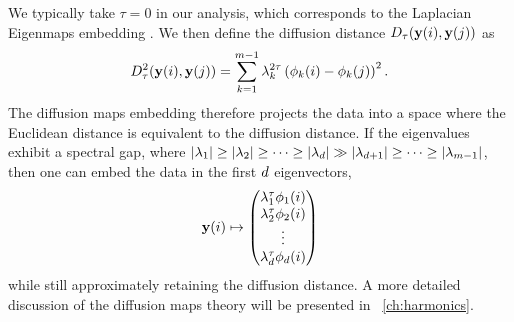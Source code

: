 %
We typically take $\tau=0$ in our analysis, which corresponds to the Laplacian Eigenmaps embedding \cite{Belkin2003}.  
%
We then define the diffusion distance $D_\tau (\mathbf{y}(i), \mathbf{y}(j))$ as 
\begin{equation}
D_\tau^2 (\mathbf{y}(i), \mathbf{y}(j)) = \sum_{k=1}^{m-1} \lambda_k^{2\tau} \left( \phi_k(i)- \phi_k(j) \right)^2.
\end{equation}
%
The diffusion maps embedding therefore projects the data into a space where the Euclidean distance is equivalent to the diffusion distance. 
%
If the eigenvalues exhibit a spectral gap, where $|\lambda_1| \ge |\lambda_2| \ge \dots \ge |\lambda_d | \gg |\lambda_{d+1} | \ge \dots \ge |\lambda_{m-1}|$, then one can embed the data in the first $d$ eigenvectors, 
\begin{equation} \label{eq:dmaps_embed_reduced}
\mathbf{y}(i) \mapsto 
\begin{pmatrix}
\lambda_1^\tau \phi_1(i) \\
\lambda_2^\tau \phi_2(i) \\
\vdots \\
\lambda_{d}^\tau  \phi_{d}(i)
\end{pmatrix}
\end{equation}
%
while still approximately retaining the diffusion distance. 
%
A more detailed discussion of the diffusion maps theory will be presented in \chap~\ref{ch:harmonics}. 






